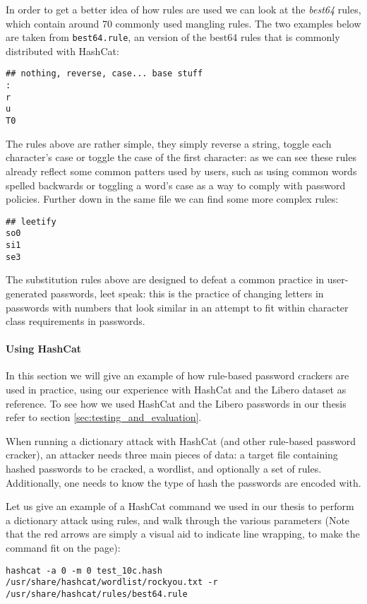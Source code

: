 In order to get a better idea of how rules are used we can look at the \emph{best64} rules, which contain around 70 commonly used mangling rules. The two examples below are taken from \texttt{best64.rule}, an version of the best64 rules that is commonly distributed with HashCat:
\begin{verbatim}
## nothing, reverse, case... base stuff
:
r
u
T0
\end{verbatim}

The rules above are rather simple, they simply reverse a string, toggle each character's case or toggle the case of the first character: as we can see these rules already reflect some common patters used by users, such as using common words spelled backwards or toggling a word's case as a way to comply with password policies.
Further down in the same file we can find some more complex rules:
\begin{verbatim}
## leetify
so0
si1
se3
\end{verbatim}

The substitution rules above are designed to defeat a common practice in user-generated passwords, leet speak: this is the practice of changing letters in passwords with numbers that look similar in an attempt to fit within character class requirements in passwords. 

\paragraph{Using HashCat}
In this section we will give an example of how rule-based password crackers are used in practice, using our experience with HashCat and the Libero dataset as reference. To see how we used HashCat and the Libero passwords in our thesis refer to section \ref{sec:testing_and_evaluation}.

When running a dictionary attack with HashCat (and other rule-based password cracker), an attacker needs three main pieces of data: a target file containing hashed passwords to be cracked, a wordlist, and optionally a set of rules.
Additionally, one needs to know the type of hash the passwords are encoded with.

Let us give an example of a HashCat command we used in our thesis to perform a dictionary attack using rules, and walk through the various parameters (Note that the red arrows are simply a visual aid to indicate line wrapping, to make the command fit on the page):

\begin{lstlisting}[breaklines=true,postbreak=\mbox{\textcolor{red}{$\hookrightarrow$}\space}]
hashcat -a 0 -m 0 test_10c.hash /usr/share/hashcat/wordlist/rockyou.txt -r /usr/share/hashcat/rules/best64.rule
\end{lstlisting}

